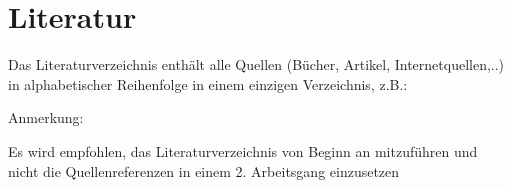 \chapter{Literatur}

Das Literaturverzeichnis enthält alle Quellen (Bücher, Artikel, Internetquellen,..) in alphabetischer Reihenfolge in einem einzigen Verzeichnis, z.B.: 

\begingroup
\let\clearpage\relax
\printbibliography[heading=none] 
\endgroup

\noindent Anmerkung: 

\noindent Es wird empfohlen, das Literaturverzeichnis von Beginn an mitzuführen und nicht die Quellenreferenzen in einem 2. Arbeitsgang einzusetzen

\newpage